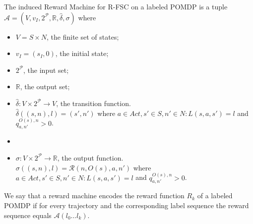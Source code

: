 \begin{definition}
	The induced Reward Machine for R-FSC on a labeled POMDP is a tuple $\mathcal{A}=(V,v_I,2^{\mathcal{P}},\mathbb{R},\hat{\delta},\sigma)$ where 
	\begin{itemize}
		\item $V=S\times N$, the finite set of states;
		\item $v_I=(s_I,0)$, the initial state;
		\item $2^{\mathcal{P}}$, the input set;
		\item $\mathbb{R}$, the output set;
		\item $\hat{\delta}:V\times 2^{\mathcal{P}} \to V$, the transition function. \\
			$\hat{\delta}((s,n),l)=(s',n')$ where $a\in Act,s'\in S,n'\in N: L(s,a,s')=l$ and $q^{O(s),n}_{a,n'}>0$. 
		\item \item $\sigma:V\times 2^{\mathcal{P}} \to \mathbb{R}$, the output function. \\
		$\sigma((s,n),l)=\mathcal{R}(n,O(s),a,n')$ where $a\in Act,s'\in S,n'\in N: L(s,a,s')=l$ and $q^{O(s),n}_{a,n'}>0$. 
	\end{itemize}
\end{definition}

We say that a reward machine encodes the reward function $R_k$ of a labeled POMDP if for every trajectory and the corresponding label sequence the reward sequence equals $\mathcal{A}(l_0\dots l_k)$.